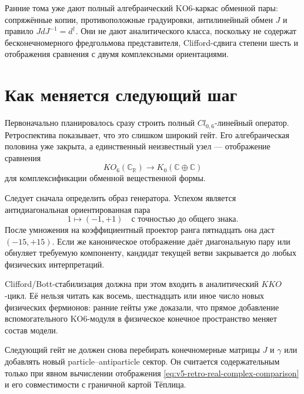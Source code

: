 \begin{theorem}
Ранние тома уже дают полный алгебраический KO6-каркас обменной пары:
сопряжённые копии, противоположные градуировки, антилинейный обмен $J$ и
правило $JdJ^{-1}=d^\dagger$. Они не дают аналитического класса, поскольку
не содержат бесконечномерного фредгольмова представителя, Clifford-сдвига
степени шесть и отображения сравнения с двумя комплексными ориентациями.
\end{theorem}

\section{Как меняется следующий шаг}

Первоначально планировалось сразу строить полный $Cl_{0,6}$-линейный
оператор. Ретроспектива показывает, что это слишком широкий гейт. Его
алгебраическая половина уже закрыта, а единственный неизвестный узел ---
отображение сравнения
\begin{equation}
 KO_6(\mathbb C_{\mathbb R})
 \longrightarrow
 K_0(\mathbb C\oplus\mathbb C)
 \label{eq:v5-retro-real-complex-comparison}
\end{equation}
для комплексификации обменной вещественной формы.

Следует сначала определить образ генератора. Успехом является
антидиагональная ориентированная пара
\begin{equation}
 1\longmapsto(-1,+1)
 \quad\text{с точностью до общего знака}.
 \label{eq:v5-retro-required-antidiagonal}
\end{equation}
После умножения на коэффициентный проектор ранга пятнадцать она даст
$(-15,+15)$. Если же каноническое отображение даёт диагональную пару или
обнуляет требуемую компоненту, кандидат текущей ветви закрывается до
любых физических интерпретаций.

Clifford/Bott-стабилизация должна при этом входить в аналитический
$KKO$-цикл. Её нельзя читать как восемь, шестнадцать или иное число новых
физических фермионов: ранние гейты уже доказали, что прямое добавление
вспомогательного KO6-модуля в физическое конечное пространство меняет
состав модели.

\begin{nogocriterion}
Следующий гейт не должен снова перебирать конечномерные матрицы $J$ и
$\gamma$ или добавлять новый particle--antiparticle сектор. Он считается
содержательным только при явном вычислении отображения
\eqref{eq:v5-retro-real-complex-comparison} и его совместимости с
граничной картой Тёплица.
\end{nogocriterion}


